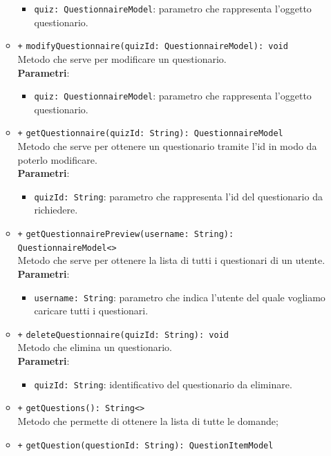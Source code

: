 \begin{itemize}
\begin{itemize}
\begin{itemize}
				\item
				\texttt{quiz: QuestionnaireModel}: parametro che rappresenta l'oggetto questionario.
			\end{itemize}
		\item \texttt{+} \texttt{modifyQuestionnaire(quizId: QuestionnaireModel): void} \\ Metodo che serve per modificare un questionario. \\
			\textbf{Parametri}:
			\begin{itemize}
				\item \texttt{quiz: QuestionnaireModel}: parametro che rappresenta l'oggetto questionario.
			\end{itemize}
		\item \texttt{+} \texttt{getQuestionnaire(quizId: String): QuestionnaireModel} \\Metodo che serve per ottenere un questionario tramite l'id in modo da poterlo modificare. \\
			\textbf{Parametri}:
			\begin{itemize}
				\item \texttt{quizId: String}: parametro che rappresenta l'id del questionario da richiedere.
			\end{itemize}
		\item \texttt{+} \texttt{getQuestionnairePreview(username: String): QuestionnaireModel<>} \\ Metodo che serve per ottenere la lista di tutti i questionari di un utente. \\
			\textbf{Parametri}:
			\begin{itemize}
				\item \texttt{username: String}: parametro che indica l'utente del quale vogliamo caricare tutti i questionari.
			\end{itemize}
		\item \texttt{+} \texttt{deleteQuestionnaire(quizId: String): void} \\Metodo che elimina un questionario. \\
		\textbf{Parametri}:
		\begin{itemize}
			\item
			\texttt{quizId: String}: identificativo del questionario da eliminare.
		\end{itemize}
		\item \texttt{+} \texttt{getQuestions(): String<>} \\
		Metodo che permette di ottenere la lista di tutte le domande;
		\item \texttt{+} \texttt{getQuestion(questionId: String): QuestionItemModel} \\

\end{itemize}
\end{itemize}
